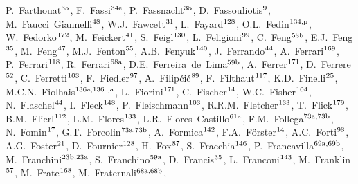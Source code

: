 \begin{flushleft}
P.~Farthouat$^\textrm{\scriptsize 35}$,    
F.~Fassi$^\textrm{\scriptsize 34e}$,    
P.~Fassnacht$^\textrm{\scriptsize 35}$,    
D.~Fassouliotis$^\textrm{\scriptsize 9}$,    
M.~Faucci~Giannelli$^\textrm{\scriptsize 48}$,    
W.J.~Fawcett$^\textrm{\scriptsize 31}$,    
L.~Fayard$^\textrm{\scriptsize 128}$,    
O.L.~Fedin$^\textrm{\scriptsize 134,p}$,    
W.~Fedorko$^\textrm{\scriptsize 172}$,    
M.~Feickert$^\textrm{\scriptsize 41}$,    
S.~Feigl$^\textrm{\scriptsize 130}$,    
L.~Feligioni$^\textrm{\scriptsize 99}$,    
C.~Feng$^\textrm{\scriptsize 58b}$,    
E.J.~Feng$^\textrm{\scriptsize 35}$,    
M.~Feng$^\textrm{\scriptsize 47}$,    
M.J.~Fenton$^\textrm{\scriptsize 55}$,    
A.B.~Fenyuk$^\textrm{\scriptsize 140}$,    
J.~Ferrando$^\textrm{\scriptsize 44}$,    
A.~Ferrari$^\textrm{\scriptsize 169}$,    
P.~Ferrari$^\textrm{\scriptsize 118}$,    
R.~Ferrari$^\textrm{\scriptsize 68a}$,    
D.E.~Ferreira~de~Lima$^\textrm{\scriptsize 59b}$,    
A.~Ferrer$^\textrm{\scriptsize 171}$,    
D.~Ferrere$^\textrm{\scriptsize 52}$,    
C.~Ferretti$^\textrm{\scriptsize 103}$,    
F.~Fiedler$^\textrm{\scriptsize 97}$,    
A.~Filip\v{c}i\v{c}$^\textrm{\scriptsize 89}$,    
F.~Filthaut$^\textrm{\scriptsize 117}$,    
K.D.~Finelli$^\textrm{\scriptsize 25}$,    
M.C.N.~Fiolhais$^\textrm{\scriptsize 136a,136c,a}$,    
L.~Fiorini$^\textrm{\scriptsize 171}$,    
C.~Fischer$^\textrm{\scriptsize 14}$,    
W.C.~Fisher$^\textrm{\scriptsize 104}$,    
N.~Flaschel$^\textrm{\scriptsize 44}$,    
I.~Fleck$^\textrm{\scriptsize 148}$,    
P.~Fleischmann$^\textrm{\scriptsize 103}$,    
R.R.M.~Fletcher$^\textrm{\scriptsize 133}$,    
T.~Flick$^\textrm{\scriptsize 179}$,    
B.M.~Flierl$^\textrm{\scriptsize 112}$,    
L.M.~Flores$^\textrm{\scriptsize 133}$,    
L.R.~Flores~Castillo$^\textrm{\scriptsize 61a}$,    
F.M.~Follega$^\textrm{\scriptsize 73a,73b}$,    
N.~Fomin$^\textrm{\scriptsize 17}$,    
G.T.~Forcolin$^\textrm{\scriptsize 73a,73b}$,    
A.~Formica$^\textrm{\scriptsize 142}$,    
F.A.~F\"orster$^\textrm{\scriptsize 14}$,    
A.C.~Forti$^\textrm{\scriptsize 98}$,    
A.G.~Foster$^\textrm{\scriptsize 21}$,    
D.~Fournier$^\textrm{\scriptsize 128}$,    
H.~Fox$^\textrm{\scriptsize 87}$,    
S.~Fracchia$^\textrm{\scriptsize 146}$,    
P.~Francavilla$^\textrm{\scriptsize 69a,69b}$,    
M.~Franchini$^\textrm{\scriptsize 23b,23a}$,    
S.~Franchino$^\textrm{\scriptsize 59a}$,    
D.~Francis$^\textrm{\scriptsize 35}$,    
L.~Franconi$^\textrm{\scriptsize 143}$,    
M.~Franklin$^\textrm{\scriptsize 57}$,    
M.~Frate$^\textrm{\scriptsize 168}$,    
M.~Fraternali$^\textrm{\scriptsize 68a,68b}$,    

\end{flushleft}
